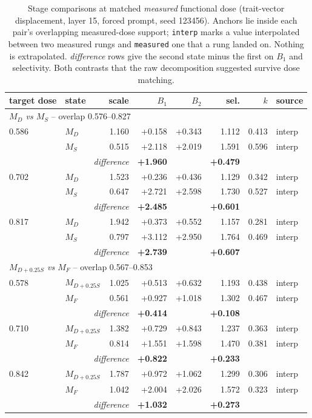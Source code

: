 \begin{table}[!ht]
\centering
\small
\begin{tabular}{llrrrrrl}
\toprule
target dose & state & scale & $B_1$ & $B_2$ & sel. & $k$ & source \\
\midrule
\multicolumn{8}{l}{\emph{$M_D$ vs $M_S$} -- overlap 0.576--0.827} \\
\midrule
0.586 & $M_D$ & 1.160 & +0.158 & +0.343 & 1.112 & 0.413 & interp \\
 & $M_S$ & 0.515 & +2.118 & +2.019 & 1.591 & 0.596 & interp \\
& \multicolumn{2}{r}{\emph{difference}} & \textbf{+1.960} & & \textbf{+0.479} & & \\
0.702 & $M_D$ & 1.523 & +0.236 & +0.436 & 1.129 & 0.342 & interp \\
 & $M_S$ & 0.647 & +2.721 & +2.598 & 1.730 & 0.527 & interp \\
& \multicolumn{2}{r}{\emph{difference}} & \textbf{+2.485} & & \textbf{+0.601} & & \\
0.817 & $M_D$ & 1.942 & +0.373 & +0.552 & 1.157 & 0.281 & interp \\
 & $M_S$ & 0.797 & +3.112 & +2.950 & 1.764 & 0.469 & interp \\
& \multicolumn{2}{r}{\emph{difference}} & \textbf{+2.739} & & \textbf{+0.607} & & \\
\midrule
\multicolumn{8}{l}{\emph{$M_{D+0.25S}$ vs $M_F$} -- overlap 0.567--0.853} \\
\midrule
0.578 & $M_{D+0.25S}$ & 1.025 & +0.513 & +0.632 & 1.193 & 0.438 & interp \\
 & $M_F$ & 0.561 & +0.927 & +1.018 & 1.302 & 0.467 & interp \\
& \multicolumn{2}{r}{\emph{difference}} & \textbf{+0.414} & & \textbf{+0.108} & & \\
0.710 & $M_{D+0.25S}$ & 1.382 & +0.729 & +0.843 & 1.237 & 0.363 & interp \\
 & $M_F$ & 0.814 & +1.551 & +1.598 & 1.470 & 0.381 & interp \\
& \multicolumn{2}{r}{\emph{difference}} & \textbf{+0.822} & & \textbf{+0.233} & & \\
0.842 & $M_{D+0.25S}$ & 1.787 & +0.972 & +1.062 & 1.299 & 0.306 & interp \\
 & $M_F$ & 1.042 & +2.004 & +2.026 & 1.572 & 0.323 & interp \\
& \multicolumn{2}{r}{\emph{difference}} & \textbf{+1.032} & & \textbf{+0.273} & & \\
\bottomrule
\end{tabular}
\caption{Stage comparisons at matched \emph{measured} functional dose (trait-vector displacement, layer 15, forced prompt, seed 123456). Anchors lie inside each pair's overlapping measured-dose support; \texttt{interp} marks a value interpolated between two measured rungs and \texttt{measured} one that a rung landed on. Nothing is extrapolated. \emph{difference} rows give the second state minus the first on $B_1$ and selectivity. Both contrasts that the raw decomposition suggested survive dose matching.}
\label{tab:oct-matched-dose}
\end{table}
